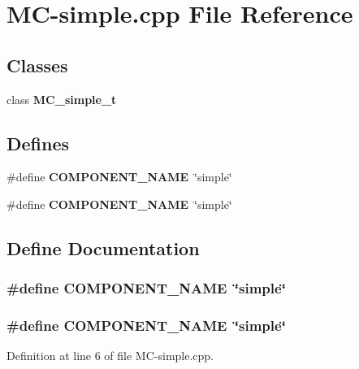 \section{MC-simple.cpp File Reference}
\label{MC-simple_8cpp}
\subsection*{Classes}
\begin{CompactItemize}
\item 
class {\bf MC\_\-simple\_\-t}
\end{CompactItemize}
\subsection*{Defines}
\begin{CompactItemize}
\item 
\#define {\bf COMPONENT\_\-NAME}~\char`\"{}simple\char`\"{}
\item 
\#define {\bf COMPONENT\_\-NAME}~\char`\"{}simple\char`\"{}
\end{CompactItemize}


\subsection{Define Documentation}
\subsubsection[{COMPONENT\_\-NAME}]{\setlength{\rightskip}{0pt plus 5cm}\#define COMPONENT\_\-NAME~\char`\"{}simple\char`\"{}}\label{zesto-MC_8cpp_9146ade7ce24e3db226a973a59063892}


\subsubsection[{COMPONENT\_\-NAME}]{\setlength{\rightskip}{0pt plus 5cm}\#define COMPONENT\_\-NAME~\char`\"{}simple\char`\"{}}\label{MC-simple_8cpp_9146ade7ce24e3db226a973a59063892}




Definition at line 6 of file MC-simple.cpp.